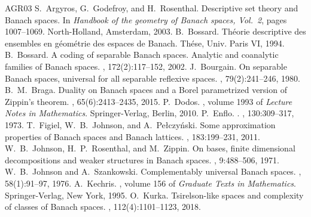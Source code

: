 \documentclass[letterpaper]{amsart}
\numberwithin{equation}{section}
\theoremstyle{definition}
\begin{document}
 
\begin{thebibliography}{AGR03}
S.~Argyros, G.~Godefroy, and H.~Rosenthal.
\newblock Descriptive set theory and {B}anach spaces.
\newblock In {\em Handbook of the geometry of {B}anach spaces, {V}ol.\ 2},
pages 1007--1069.
\newblock North-Holland, Amsterdam, 2003.
B.~Bossard.
\newblock  Théorie descriptive des ensembles en géométrie des espaces de
Banach. 
\newblock Thése, Univ. Paris VI, 1994.
B.~Bossard.
\newblock A coding of separable {B}anach spaces. Analytic and coanalytic families
of {B}anach spaces.
, 172(2):117--152, 2002.
J.~Bourgain.
\newblock On separable {B}anach spaces, universal for all separable reflexive
spaces.
, 79(2):241--246, 1980.
B.~M.~Braga.
\newblock Duality on {B}anach spaces and a {B}orel parametrized version of
{Z}ippin's theorem.
, 65(6):2413--2435, 2015.
P.~Dodos.
,
volume 1993 of {\em Lecture Notes in Mathematics}.
\newblock Springer-Verlag, Berlin, 2010.
P.~Enflo.
.
, 130:309--317, 1973.
T.~Figiel, W.~B.~Johnson, and A.~Pe{\l}czy\'nski.
\newblock Some approximation properties of {B}anach spaces and {B}anach
lattices.
, 183:199--231, 2011.
W.~B.~Johnson, H.~P.~Rosenthal, and M.~Zippin.
\newblock On bases, finite dimensional decompositions and weaker structures in
{B}anach spaces.
, 9:488--506, 1971.
W.~B.~Johnson and A.~Szankowski.
\newblock Complementably universal {B}anach spaces.
, 58(1):91--97, 1976.
A.~Kechris.
, volume 156 of {\em Graduate
Texts in Mathematics}.
\newblock Springer-Verlag, New York, 1995.
O.~Kurka.
\newblock Tsirelson-like spaces and complexity of classes of {B}anach spaces.
,
112(4):1101--1123, 2018.

\end{thebibliography}
\end{document}
